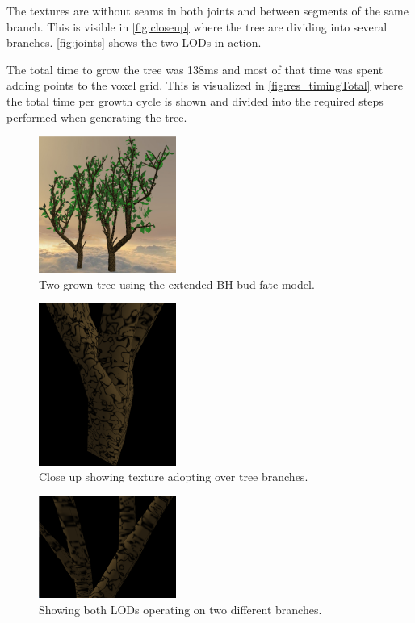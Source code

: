 \documentclass[11pt]{article} %
\begin{document}
The textures are without seams in both joints and between segments of the same branch.
This is visible in \autoref{fig:closeup} where the tree are dividing into several branches.
\autoref{fig:joints} shows the two LODs in action.

The total time to grow the tree was 138ms and most of that time was spent adding points to the voxel grid.
This is visualized in \autoref{fig:res_timingTotal} where the total time per growth cycle is shown and divided into the required steps performed when generating the tree.

\begin{figure}[!htp]
	\centering
	\includegraphics[width=0.4\textwidth]{2tree.png}
	\caption{Two grown tree using the extended BH bud fate model.}
	\label{fig:res_2tree}
\end{figure}

\begin{figure}[htp]
	\centering
	\includegraphics[width=0.4\textwidth]{joints.png}
	\caption{Close up showing texture adopting over tree branches.}
	\label{fig:closeup}
\end{figure}

\begin{figure}[htp]
	\centering
	\includegraphics[width=0.4\textwidth]{closeup.png}
	\caption{Showing both LODs operating on two different branches.}
	\label{fig:joints}
\end{figure}
\end{document}
